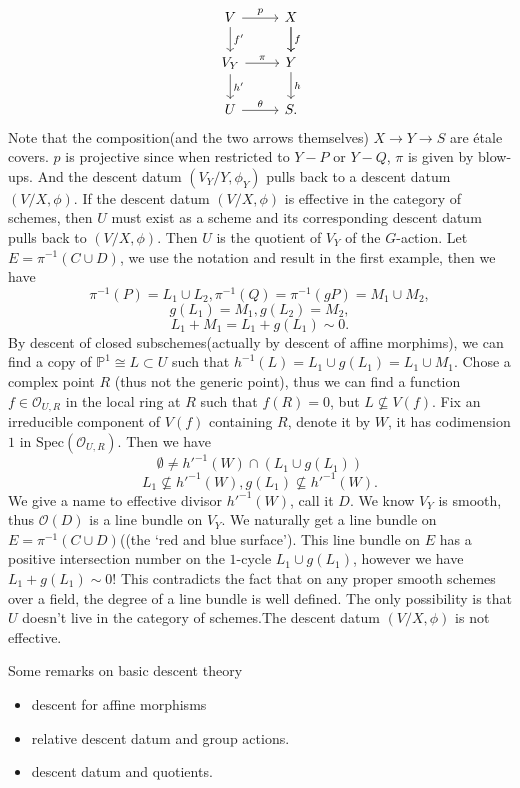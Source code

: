\documentclass[main.tex]{subfiles}
\begin{document}
\begin{example}
$$\begin{tikzcd}V\arrow{r}{p}\arrow{d}{f'} & X\arrow{d}\arrow{d}{f}\\
V_{Y}\arrow{r}{\pi}\arrow{d}{h'} & Y \arrow{d}{h}\\
U\arrow{r}{\theta }& S.\end{tikzcd}$$
Note that the composition(and the two arrows themselves) $X\rightarrow Y\rightarrow S$ are étale covers. $p$ is projective since when restricted to $Y-P$ or $Y-Q$, $\pi$ is given by blow-ups. And the descent datum $(V_{Y}/Y, \phi_{Y})$ pulls back to a descent datum $(V/X, \phi).$
If the descent datum $(V/X, \phi)$ is effective in the category of schemes, then $U$ must exist as a scheme and its corresponding descent datum pulls back to $(V/X, \phi)$. Then $U$ is the quotient of $V_{Y}$ of the $G$-action. Let $E=\pi^{-1}(C\cup D)$, we use the notation and result in the first example, then we have 
$$\pi^{-1}(P)=L_{1}\cup L_{2}, \pi^{-1}(Q)=\pi^{-1}(gP)=M_{1}\cup M_{2},$$
$$g(L_{1})=M_{1}, g(L_{2})=M_{2},$$
$$L_{1}+M_{1}=L_{1}+g(L_{1})\sim 0.$$
By descent of closed subschemes(actually by descent of affine morphims), we can find a copy of $\mathbb{P}^{1}\cong L\subset U$ such that $h^{-1}(L)=L_{1}\cup g(L_{1})=L_{1}\cup M_{1}.$ Chose a complex point $R$ (thus not the generic point), thus we can find a function $f\in \mathcal{O}_{U, R}$
in the local ring at $R$ such that $f(R)=0$, but $L\nsubseteq V(f)$. Fix an irreducible component of $V(f)$ containing $R$, denote it by $W$, it has codimension $1$ in $\mathrm{Spec}(\mathcal{O}_{U,R})$. Then we have 
$$\emptyset \neq h'^{-1}(W)\cap (L_{1}\cup g(L_{1}))$$
$$L_{1}\nsubseteq h'^{-1}(W), g(L_{1})\nsubseteq h'^{-1}(W).$$
We give a name to effective divisor $h'^{-1}(W)$, call it $D$. We know $V_{Y}$ is smooth, thus $\mathcal{O}(D)$ is a line bundle on $V_{Y}$. We naturally get a line bundle on $E=\pi^{-1}(C\cup D)$((the `red and blue surface'). This line bundle on $E$ has a positive intersection number on the $1$-cycle $L_{1}\cup g(L_{1})$, however we have $L_{1}+g(L_{1})\sim 0$! This contradicts the fact that on any proper smooth schemes over a field, the degree of a line bundle is well defined. The only possibility is that $U$ doesn't live in the category of schemes.The descent datum $(V/X, \phi)$ is not effective. 
\end{example}
\begin{remark}
Some remarks on basic descent theory
\begin{itemize}
\item descent for affine morphisms
\item relative descent datum and group actions.
\item descent datum and quotients.
\end{itemize}
\end{remark}
\end{document}
